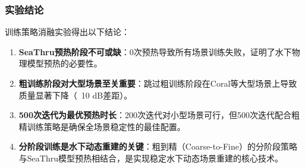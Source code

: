 \subsubsection{实验结论}

训练策略消融实验得出以下结论：
\begin{enumerate}
  \item \textbf{SeaThru预热阶段不可或缺}：0次预热导致所有场景训练失败，证明了水下物理模型预热的必要性。
  \item \textbf{粗训练阶段对大型场景至关重要}：跳过粗训练阶段在Coral等大型场景上导致质量显著下降（~10 dB差距）。
  \item \textbf{500次迭代为最优预热时长}：200次迭代对小型场景可行，但500次迭代配合粗精训练策略是确保全场景稳定性的最佳配置。
  \item \textbf{分阶段训练是水下动态重建的关键}：粗到精（Coarse-to-Fine）的分阶段策略与SeaThru模型预热相结合，是实现稳定水下动态场景重建的核心技术。
\end{enumerate}
